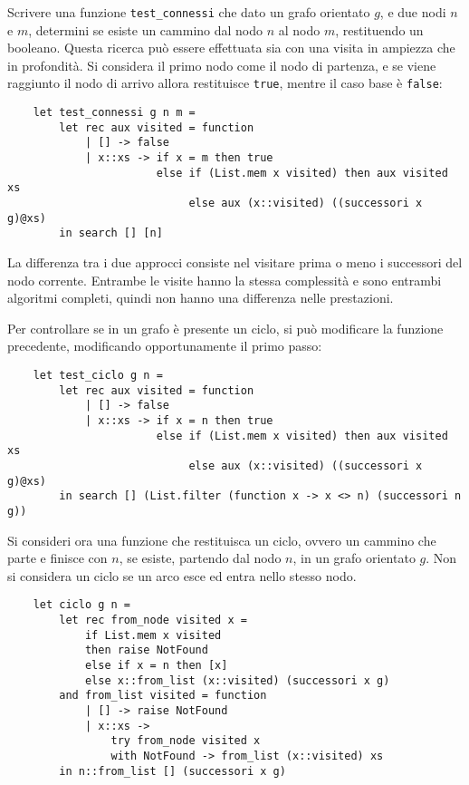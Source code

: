 \documentclass{article}
\numberwithin{equation}{subsection}
\begin{document}
Scrivere una funzione \verb|test_connessi| che dato un grafo orientato $g$, e due nodi $n$ e $m$, determini se esiste un cammino dal nodo $n$ al nodo $m$, restituendo un booleano. Questa ricerca può essere effettuata sia con una visita in ampiezza che in profondità. Si considera il primo nodo come il nodo di partenza, e se viene raggiunto il nodo di arrivo allora restituisce \verb|true|, mentre il caso base è \verb|false|:
\begin{verbatim}
    let test_connessi g n m = 
        let rec aux visited = function
            | [] -> false
            | x::xs -> if x = m then true
                       else if (List.mem x visited) then aux visited xs
                            else aux (x::visited) ((successori x g)@xs)
        in search [] [n]
\end{verbatim}
La differenza tra i due approcci consiste nel visitare prima o meno i successori del nodo corrente. Entrambe le visite hanno la stessa complessità e sono entrambi algoritmi completi, quindi non hanno una differenza nelle prestazioni. 

Per controllare se in un grafo è presente un ciclo, si può modificare la funzione precedente, modificando opportunamente il primo passo:
\begin{verbatim}
    let test_ciclo g n = 
        let rec aux visited = function
            | [] -> false
            | x::xs -> if x = n then true
                       else if (List.mem x visited) then aux visited xs
                            else aux (x::visited) ((successori x g)@xs)
        in search [] (List.filter (function x -> x <> n) (successori n g))
\end{verbatim}

Si consideri ora una funzione che restituisca un ciclo, ovvero un cammino che parte e finisce con $n$, se esiste, partendo dal nodo $n$, in un grafo orientato $g$. Non si considera un ciclo se un arco esce ed entra nello stesso nodo. 
\begin{verbatim}
    let ciclo g n = 
        let rec from_node visited x = 
            if List.mem x visited
            then raise NotFound
            else if x = n then [x]
            else x::from_list (x::visited) (successori x g)
        and from_list visited = function
            | [] -> raise NotFound
            | x::xs -> 
                try from_node visited x
                with NotFound -> from_list (x::visited) xs
        in n::from_list [] (successori x g)    
\end{verbatim}


\end{document}
